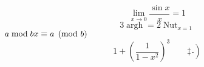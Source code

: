 \documentclass{article}
\DeclareMathOperator{\argh}{argh}
\DeclareMathOperator*{\nut}{Nut}
\begin{document}
\begin{equation*}
 \lim_{x \rightarrow 0}
 \frac{\sin x}{x}=1
\end{equation*}
\begin{equation*}
 3\argh = 2\nut_{x=1}
\end{equation*}
$a\bmod b \\
 x\equiv a \pmod{b}$
\begin{equation*}
1 + \left(\frac{1}{1-x^{2}}
  \right)^3 \qquad
\left. \ddagger \frac{~}{~}\right)
\end{equation*}
\end{document}

